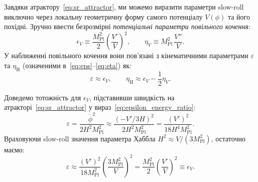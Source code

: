 
Завдяки атрактору~\eqref{eq:sr_attractor}, ми можемо виразити параметри slow-roll виключно через локальну геометричну форму самого потенціалу $V(\phi)$ та його похідні. Зручно ввести безрозмірні \emph{потенціальні параметри повільного кочення}:
\begin{equation}\label{eq:slow_roll_pot}
  \epsilon_V \equiv \frac{M_\mathrm{Pl}^2}{2}\left(\frac{V'}{V}\right)^2,
  \qquad
  \eta_V \equiv M_\mathrm{Pl}^2\,\frac{V''}{V}.
\end{equation}
У наближенні повільного кочення вони пов'язані з кінематичними параметрами $\varepsilon$ та $\eta_{\mathrm{H}}$ (означеними в~\eqref{eq:eps}--\eqref{eq:eta}) як:
\begin{equation}\label{eq:eps_eta_V}
  \varepsilon \approx \epsilon_V,
  \qquad
  \eta_{\mathrm{H}} \approx \epsilon_V - \frac{1}{2}\eta_V.
\end{equation}

Доведемо тотожність для $\epsilon_V$, підставивши швидкість на атракторі~\eqref{eq:sr_attractor} у вираз~\eqref{eq:epsilon_energy_ratio}:
\begin{equation*}
  \varepsilon = \frac{\dot\phi^2}{2H^2 M_\mathrm{Pl}^2} \approx \frac{(-V'/3H)^2}{2H^2 M_\mathrm{Pl}^2} = \frac{(V')^2}{18 H^4 M_\mathrm{Pl}^2}.
\end{equation*}
Враховуючи slow-roll значення параметра Хаббла $H^2 \approx V / (3M_\mathrm{Pl}^2)$, остаточно маємо:
\begin{equation*}
  \varepsilon \approx \frac{(V')^2}{18 M_\mathrm{Pl}^2} \left( \frac{3M_\mathrm{Pl}^2}{V} \right)^2 = \frac{M_\mathrm{Pl}^2}{2}\left(\frac{V'}{V}\right)^2 \equiv \epsilon_V.
\end{equation*}


